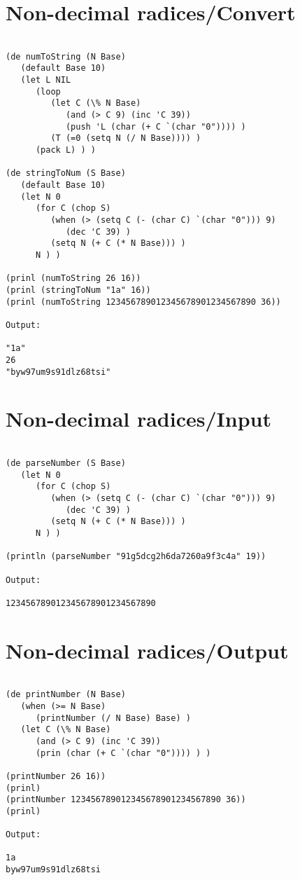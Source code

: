 \section*{Non-decimal radices/Convert}

\begin{verbatim}

(de numToString (N Base)
   (default Base 10)
   (let L NIL
      (loop
         (let C (\% N Base)
            (and (> C 9) (inc 'C 39))
            (push 'L (char (+ C `(char "0")))) )
         (T (=0 (setq N (/ N Base)))) )
      (pack L) ) )

(de stringToNum (S Base)
   (default Base 10)
   (let N 0
      (for C (chop S)
         (when (> (setq C (- (char C) `(char "0"))) 9)
            (dec 'C 39) )
         (setq N (+ C (* N Base))) )
      N ) )

(prinl (numToString 26 16))
(prinl (stringToNum "1a" 16))
(prinl (numToString 123456789012345678901234567890 36))

Output:

"1a"
26
"byw97um9s91dlz68tsi"

\end{verbatim}

\section*{Non-decimal radices/Input}

\begin{verbatim}

(de parseNumber (S Base)
   (let N 0
      (for C (chop S)
         (when (> (setq C (- (char C) `(char "0"))) 9)
            (dec 'C 39) )
         (setq N (+ C (* N Base))) )
      N ) )

(println (parseNumber "91g5dcg2h6da7260a9f3c4a" 19))

Output:

123456789012345678901234567890

\end{verbatim}

\section*{Non-decimal radices/Output}

\begin{verbatim}

(de printNumber (N Base)
   (when (>= N Base)
      (printNumber (/ N Base) Base) )
   (let C (\% N Base)
      (and (> C 9) (inc 'C 39))
      (prin (char (+ C `(char "0")))) ) )

(printNumber 26 16))
(prinl)
(printNumber 123456789012345678901234567890 36))
(prinl)

Output:

1a
byw97um9s91dlz68tsi

\end{verbatim}

